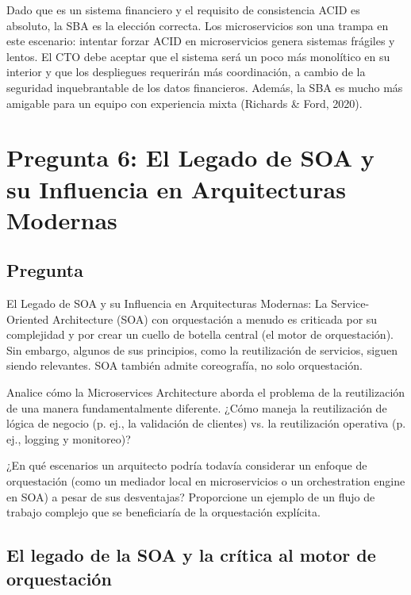 \documentclass[12pt, a4paper]{article}
\begin{document}
    Dado que es un sistema financiero y el requisito de consistencia ACID es absoluto, la SBA es la elección correcta. Los microservicios son una trampa en este escenario: intentar forzar ACID en microservicios genera sistemas frágiles y lentos. El CTO debe aceptar que el sistema será un poco más monolítico en su interior y que los despliegues requerirán más coordinación, a cambio de la seguridad inquebrantable de los datos financieros. Además, la SBA es mucho más amigable para un equipo con experiencia mixta (Richards \& Ford, 2020).

    \section[El Legado de SOA y su Influencia en Arquitecturas Modernas]{Pregunta 6: El Legado de SOA y su Influencia en Arquitecturas Modernas}

    \subsection{Pregunta}

    El Legado de SOA y su Influencia en Arquitecturas Modernas: La Service-Oriented Architecture (SOA) con orquestación a menudo es criticada por su complejidad y por crear un cuello de botella central (el motor de orquestación). Sin embargo, algunos de sus principios, como la reutilización de servicios, siguen siendo relevantes. SOA también admite coreografía, no solo orquestación.

    Analice cómo la Microservices Architecture aborda el problema de la reutilización de una manera fundamentalmente diferente. ¿Cómo maneja la reutilización de lógica de negocio (p. ej., la validación de clientes) vs. la reutilización operativa (p. ej., logging y monitoreo)?

    ¿En qué escenarios un arquitecto podría todavía considerar un enfoque de orquestación (como un mediador local en microservicios o un orchestration engine en SOA) a pesar de sus desventajas? Proporcione un ejemplo de un flujo de trabajo complejo que se beneficiaría de la orquestación explícita.

    \subsection{El legado de la SOA y la crítica al motor de orquestación}
\end{document}
